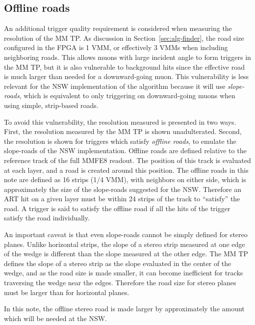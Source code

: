 \subsection{Offline roads}
\label{sec:perf-roads}

An additional trigger quality requirement is considered when measuring the resolution of the MM TP. As discussion in Section~\ref{sec:alg-finder}, the road size configured in the FPGA is 1 VMM, or effectively 3 VMMs when including neighboring roads. This allows muons with large incident angle to form triggers in the MM TP, but it is also vulnerable to background hits since the effective road is much larger than needed for a downward-going muon. This vulnerability is less relevant for the NSW implementation of the algorithm because it will use \textit{slope-roads}, which is equivalent to only triggering on downward-going muons when using simple, strip-based roads.

To avoid this vulnerability, the resolution measured is presented in two ways. First, the resolution measured by the MM TP is shown unadulterated. Second, the resolution is shown for triggers which satisfy \textit{offline roads}, to emulate the slope-roads of the NSW implementation. Offline roads are defined relative to the reference track of the full MMFE8 readout. The position of this track is evaluated at each layer, and a road is created around this position. The offline roads in this note are defined as 16 strips (1/4 VMM), with neighbors on either side, which is approximately the size of the slope-roads suggested for the NSW. Therefore an ART hit on a given layer must be within 24 strips of the track to ``satisfy'' the road. A trigger is said to satisfy the offline road if all the hits of the trigger satisfy the road individually.

An important caveat is that even slope-roads cannot be simply defined for stereo planes. Unlike horizontal strips, the slope of a stereo strip measured at one edge of the wedge is different than the slope measured at the other edge. The MM TP defines the slope of a stereo strip as the slope evaluated in the center of the wedge, and as the road size is made smaller, it can become inefficient for tracks traversing the wedge near the edges. Therefore the road size for stereo planes must be larger than for horizontal planes.

In this note, the offline stereo road is made larger by approximately the amount which will be needed at the NSW.

